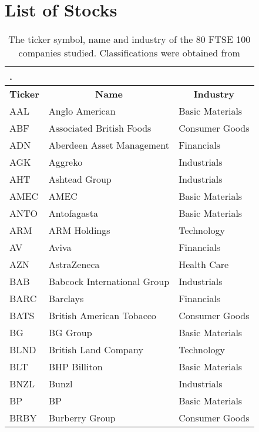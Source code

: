 
\chapter{List of Stocks}

\label{app:listFTSE100Stocks}

\begin{center}
\begin{longtable}{|l|l|l|}
	\caption[List of FTSE 100 Stocks studied]{The ticker symbol, name and industry of the 80 FTSE 100 companies studied. Classifications were obtained from \cite{IcWik,YahFi}}.
	\label{tab:listFTSE100Stocks} \\
	\hline \multicolumn{1}{|c|}{\textbf{Ticker}} & \multicolumn{1}{c|}{\textbf{Name}} & \multicolumn{1}{c|}{\textbf{Industry}} \\ \hline 
	\endfirsthead
	\hline \hline
	\endlastfoot
    AAL   & Anglo American & Basic Materials \\
    ABF   & Associated British Foods & Consumer Goods \\
    ADN   & Aberdeen Asset Management & Financials \\
    AGK   & Aggreko & Industrials \\
    AHT   & Ashtead Group & Industrials \\
    AMEC  & AMEC  & Basic Materials \\
    ANTO  & Antofagasta & Basic Materials \\
    ARM   & ARM Holdings & Technology \\
    AV    & Aviva & Financials \\
    AZN   & AstraZeneca & Health Care \\
    BAB   & Babcock International Group & Industrials \\
    BARC  & Barclays & Financials \\
    BATS  & British American Tobacco & Consumer Goods \\
    BG    & BG Group & Basic Materials \\
    BLND  & British Land Company & Technology \\
    BLT   & BHP Billiton & Basic Materials \\
    BNZL  & Bunzl & Industrials \\
    BP    & BP    & Basic Materials \\
    BRBY  & Burberry Group & Consumer Goods \\

\end{longtable}
\end{center}
